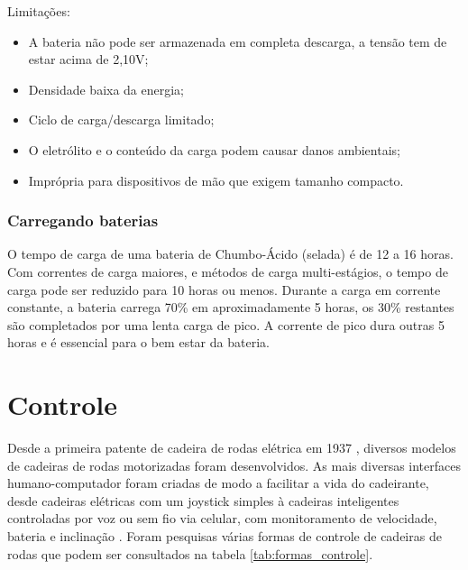 Limitações:

\begin{itemize}
	\item A bateria não pode ser armazenada em completa descarga, a tensão tem de estar acima de 2,10V;
	\item Densidade baixa da energia;
	\item Ciclo de carga/descarga limitado;
	\item O eletrólito e o conteúdo da carga podem causar danos ambientais;
	\item Imprópria para dispositivos de mão que exigem tamanho compacto.
\end{itemize}

\subsubsection{Carregando baterias}

O tempo de carga de uma bateria de Chumbo-Ácido (selada) é de 12 a 16 horas. Com correntes de carga maiores, e métodos de carga multi-estágios, o tempo de carga pode ser reduzido para 10 horas ou menos. Durante a carga em corrente constante, a bateria carrega 70\% em aproximadamente 5 horas, os 30\% restantes são completados por uma lenta carga de pico. A corrente de pico dura outras 5 horas e é essencial para o bem estar da bateria.

\section{Controle}

Desde a primeira patente de cadeira de rodas elétrica em 1937 \cite{patent_cadeira_rodas_eletrica}, diversos modelos de cadeiras de rodas motorizadas foram desenvolvidos. As mais diversas interfaces humano-computador foram criadas de modo a facilitar a vida do cadeirante, desde cadeiras elétricas com um joystick simples à cadeiras inteligentes controladas por voz ou sem fio via celular, com monitoramento de velocidade, bateria e inclinação \cite{artigo_controle_cadeira_eletrica}. Foram pesquisas várias formas de controle de cadeiras de rodas que podem ser consultados na tabela \ref{tab:formas_controle}.

